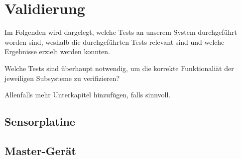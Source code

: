 \chapter{Validierung}
\label{chap:validierung}

Im Folgenden  wird dargelegt,  welche Tests  an unserem  System durchgef\"uhrt
worden  sind, weshalb  die  durchgef\"uhrten Tests  relevant  sind und  welche
Ergebnisse erzielt werden konnten.

\anweisung  Welche   Tests  sind   \"uberhaupt  notwendig,  um   die  korrekte
Funktionali\"at der jeweiligen Subsysteme zu verifizieren?

\anweisung Allenfalls mehr Unterkapitel hinzuf\"ugen, falls sinnvoll.

\section{Sensorplatine}
\label{sec:validierung:sensorplatine}


\section{Master-Ger\"at}
\label{sec:validierung:master}
